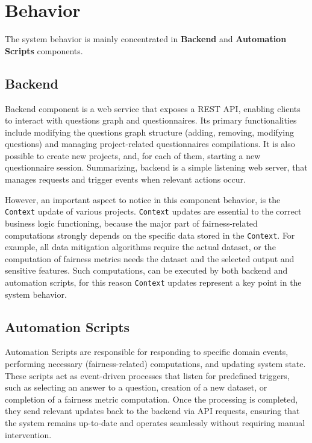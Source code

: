 \documentclass[12pt,a4paper,openright,twoside]{book}
\begin{document}
\section{Behavior}

The system behavior is mainly concentrated in \textbf{Backend} and \textbf{Automation Scripts} components.

\subsection{Backend}

Backend component is a web service that exposes a REST \ac{API}, enabling clients to interact with questions graph and questionnaires.
%
Its primary functionalities include modifying the questions graph structure (adding, removing, modifying questions) and managing project-related questionnaires compilations.
%
It is also possible to create new projects, and, for each of them, starting a new questionnaire session.
%
Summarizing, backend is a simple listening web server, that manages requests and trigger events when relevant actions occur.

However, an important aspect to notice in this component behavior, is the \texttt{Context} update of various projects.
%
\texttt{Context} updates are essential to the correct business logic functioning, because the major part of fairness-related computations strongly depends on the specific data stored in the \texttt{Context}.
%
For example, all data mitigation algorithms require the actual dataset, or the computation of fairness metrics needs the dataset and the selected output and sensitive features.
%
Such computations, can be executed by both backend and automation scripts, for this reason \texttt{Context} updates represent a key point in the system behavior.

\subsection{Automation Scripts}

Automation Scripts are responsible for responding to specific domain events, performing necessary (fairness-related) computations, and updating system state.
%
These scripts act as event-driven processes that listen for predefined triggers, such as selecting an answer to a question, creation of a new dataset, or completion of a fairness metric computation.
%
Once the processing is completed, they send relevant updates back to the backend via \ac{API} requests, ensuring that the system remains up-to-date and operates seamlessly without requiring manual intervention.
\end{document}
